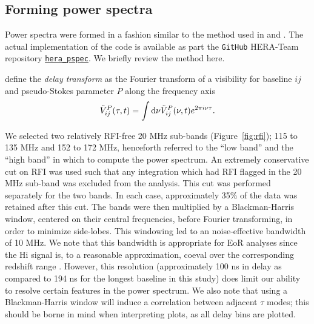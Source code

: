 \documentclass[twocolumn, trackchanges]{aastex61}
\begin{document}
\subsection{Forming power spectra}
\label{subsec:pspec}

Power spectra were formed in a fashion similar to the method used in
\cite{Pober13} and \cite{Kohn16}.  The actual implementation of the code is
available as part the {\tt GitHub} HERA-Team repository
\href{https://github.com/HERA-Team/hera_pspec}{\underline{{\tt hera\_pspec}}}.
We briefly review the method here.

\cite{Parsons.12a} define the \textit{delay transform} as the Fourier transform
of a visibility for baseline $ij$ and pseudo-Stokes parameter $P$ along the
frequency axis
\begin{equation}
\label{eq:DelaySpectrum}
\tilde{V}_{ij}^{P}(\tau, t) = \int {\rm d}\nu \tilde{V}_{ij}^{P}(\nu, t)e^{2\pi i \nu \tau}.
\end{equation}

We selected two relatively RFI-free 20 MHz sub-bands (Figure~\ref{fig:rfi}); 115
to 135 MHz and 152 to 172 MHz, henceforth referred to the ``low band'' and the
``high band'' in which to compute the power spectrum.  An extremely conservative
cut on RFI was used such that any integration which had RFI flagged in the 20
MHz sub-band was excluded from the analysis.  This cut was performed separately
for the two bands.  In each case, approximately 35\% of the data was retained
after this cut.
The bands were then multiplied by a Blackman-Harris window, centered on their
central frequencies, before Fourier transforming, in order to minimize
side-lobes. This windowing led to an noise-effective bandwidth of 10 MHz.  We
note that this bandwidth is appropriate for EoR analyses since the {\sc Hi}
signal is, to a reasonable approximation, coeval over the corresponding redshift
range \citep{Furlanetto06}.  However, this resolution (approximately 100 ns in
delay as compared to 194 ns for the longest baseline in this study) does limit
our ability to resolve certain features in the power spectrum.  We also note
that using a Blackman-Harris window will induce a correlation between adjacent
$\tau$ modes; this should be borne in mind when interpreting plots, as all delay
bins are plotted.
\end{document}
